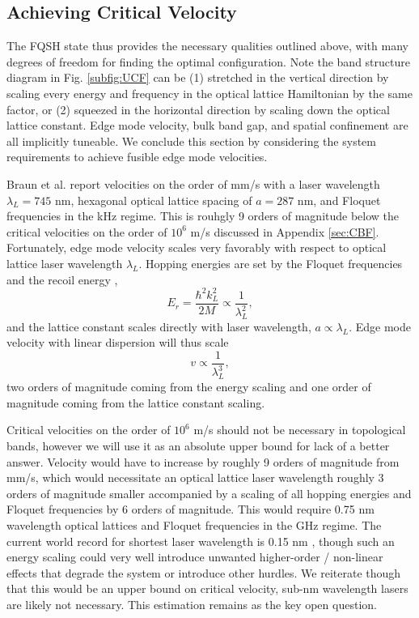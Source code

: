 \documentclass[onecolumn,
               superscriptaddress,
               floatfix,
               longbibliography, 
               showkeys,apl]{revtex4-2}
\begin{document}
\begin{appendices}
\subsection{Achieving Critical Velocity}\label{sec:critvel}

The FQSH state thus provides the necessary qualities outlined above, with many degrees of freedom for finding the optimal configuration. Note the band structure diagram in Fig. \ref{subfig:UCF} can be (1) stretched in the vertical direction by scaling every energy and frequency in the optical lattice Hamiltonian by the same factor, or (2) squeezed in the horizontal direction by scaling down the optical lattice constant. Edge mode velocity, bulk band gap, and spatial confinement are all implicitly tuneable. We conclude this section by considering the system requirements to achieve fusible edge mode velocities.

Braun et al. \cite{braun2023realspace} report velocities on the order of mm/s with a laser wavelength $\lambda_L=745$ nm, hexagonal optical lattice spacing of $a=287$ nm, and Floquet frequencies in the kHz regime. This is rouhgly 9 orders of magnitude below the critical velocities on the order of $10^6$ m/s discussed in Appendix \ref{sec:CBF}. Fortunately, edge mode velocity scales very favorably with respect to optical lattice laser wavelength $\lambda_L$. Hopping energies are set by the Floquet frequencies and the recoil energy \cite{Sch_fer_2020}, 
\begin{equation}
    E_r=\frac{\hbar^2k_L^2}{2M}\propto \frac{1}{\lambda_L^2},
\end{equation}
and the lattice constant scales directly with laser wavelength, $a \propto \lambda_L$. Edge mode velocity with linear dispersion will thus scale 
\begin{equation}
v \propto \frac{1}{\lambda_L^3},
\end{equation}
two orders of magnitude coming from the energy scaling and one order of magnitude coming from the lattice constant scaling.

Critical velocities on the order of $10^6$ m/s should not be necessary in topological bands, however we will use it as an absolute upper bound for lack of a better answer. Velocity would have to increase by roughly 9 orders of magnitude from mm/s, which would necessitate an optical lattice laser wavelength roughly 3 orders of magnitude smaller accompanied by a scaling of all hopping energies and Floquet frequencies by 6 orders of magnitude. This would require 0.75 nm wavelength optical lattices and Floquet frequencies in the GHz regime. The current world record for shortest laser wavelength is 0.15 nm \cite{Yoneda2015}, though such an energy scaling could very well introduce unwanted higher-order / non-linear effects that degrade the system or introduce other hurdles. We reiterate though that this would be an upper bound on critical velocity, sub-nm wavelength lasers are likely not necessary. This estimation remains as the key open question.


\end{appendices}
\end{document}

